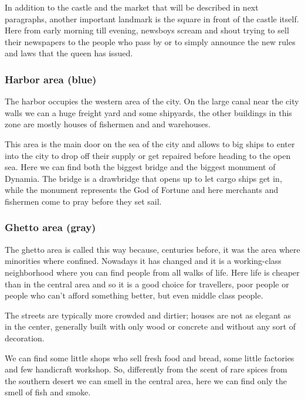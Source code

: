 In addition to the castle and the market that will be described in next paragraphs, another important landmark is the square in front of the castle itself. Here from early morning till evening, newsboys scream and shout trying to sell their newspapers to the people who pass by  or to simply announce the new rules and laws that the queen has issued.

\subsubsection{Harbor area (blue)}
The harbor occupies the western area of the city. On the large canal near the city walls we can a huge freight yard and some shipyards, the  other buildings in this zone are mostly houses of fishermen and and warehouses.

This area is the main door on the sea of the city and allows to big ships to enter into the city to drop off their supply or get repaired before heading to the open sea. Here we can find both the biggest bridge and the biggest monument of Dynamia. The bridge is a drawbridge that opens up to let cargo ships get in, while the monument represents the God of Fortune and here merchants and fishermen come to pray before they set sail.

\subsubsection{Ghetto area (gray)}
The ghetto area is called this way because, centuries before, it was the area where  minorities where confined. Nowadays it has changed and it is a working-class neighborhood where you can find people from all walks of life. Here life is cheaper than in the central area and so it is a good choice for travellers, poor people or people who can't afford something better, but even middle class people.

The streets are typically more crowded and dirtier; houses are not as elegant as in the center, generally built with only wood or concrete and without any sort of decoration.

We can find some little shops who sell fresh food and bread, some little factories and few handicraft workshop. So, differently from the scent of rare spices from the southern desert we can smell in the central area, here we can find only the smell of fish and smoke.


